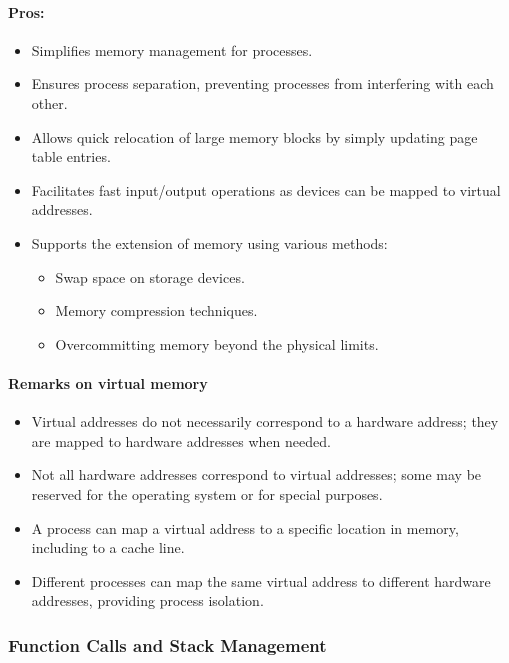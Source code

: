 \documentclass[12pt]{article}
\begin{document}
\paragraph{Pros:}
\begin{itemize}
    \item Simplifies memory management for processes.
    \item Ensures process separation, preventing processes from interfering with each other.
    \item Allows quick relocation of large memory blocks by simply updating page table entries.
    \item Facilitates fast input/output operations as devices can be mapped to virtual addresses.
    \item Supports the extension of memory using various methods:
    \begin{itemize}
        \item Swap space on storage devices.
        \item Memory compression techniques.
        \item Overcommitting memory beyond the physical limits.
    \end{itemize}
\end{itemize}

\paragraph{Remarks on virtual memory}

\begin{itemize}
    \item Virtual addresses do not necessarily correspond to a hardware address; they are mapped to hardware addresses when needed.
    \item Not all hardware addresses correspond to virtual addresses; some may be reserved for the operating system or for special purposes.
    \item A process can map a virtual address to a specific location in memory, including to a cache line.
    \item Different processes can map the same virtual address to different hardware addresses, providing process isolation.
\end{itemize}


\subsubsection{Function Calls and Stack Management}
\end{document}
